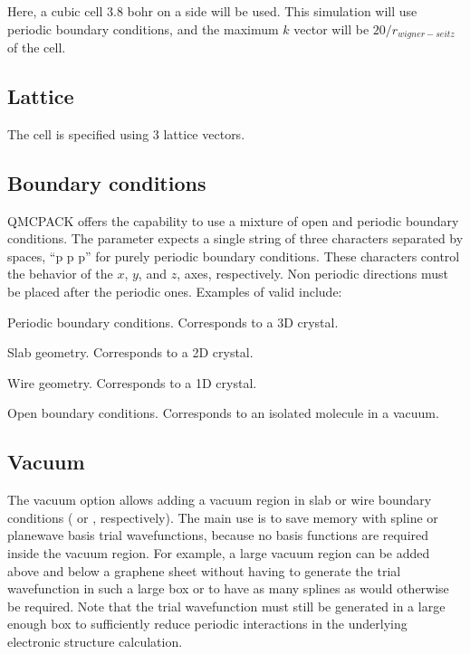 \documentclass[letterpaper,10pt,english]{sphinxmanual}
\begin{document}
Here, a cubic cell 3.8 bohr on a side will be used. This simulation will
use periodic boundary conditions, and the maximum \(k\) vector will
be \(20/r_{wigner-seitz}\) of the cell.


\subsection{Lattice}
\label{\detokenize{simulationcell:lattice}}
The cell is specified using 3 lattice vectors.


\subsection{Boundary conditions}
\label{\detokenize{simulationcell:boundary-conditions}}
QMCPACK offers the capability to use a mixture of open and periodic
boundary conditions. The parameter expects a single string of three
characters separated by spaces,  “p p p” for purely periodic
boundary conditions. These characters control the behavior of the
\(x\), \(y\), and \(z\), axes, respectively. Non periodic
directions must be placed after the periodic ones. Examples of valid
include:

 Periodic boundary conditions. Corresponds to a 3D crystal.

 Slab geometry. Corresponds to a 2D crystal.

 Wire geometry. Corresponds to a 1D crystal.

Open boundary conditions. Corresponds to an isolated molecule in a vacuum.


\subsection{Vacuum}
\label{\detokenize{simulationcell:vacuum}}
The vacuum option allows adding a vacuum region in slab or wire boundary
conditions ( or , respectively). The main use is to save memory with
spline or plane\sphinxhyphen{}wave basis trial wavefunctions, because no basis
functions are required inside the vacuum region. For example, a large
vacuum region can be added above and below a graphene sheet without
having to generate the trial wavefunction in such a large box or to have
as many splines as would otherwise be required. Note that the trial
wavefunction must still be generated in a large enough box to
sufficiently reduce periodic interactions in the underlying electronic
structure calculation.
\end{document}
